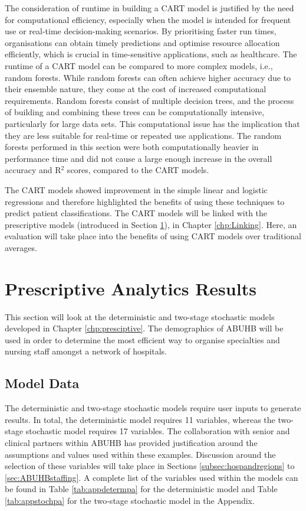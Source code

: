 \documentclass[../thesis.tex]{subfiles}
\begin{document}
The consideration of runtime in building a CART model is justified by the need for computational efficiency, especially when the model is intended for frequent use or real-time decision-making scenarios. By prioritising faster run times, organisations can obtain timely predictions and optimise resource allocation efficiently, which is crucial in time-sensitive applications, such as healthcare. The runtime of a CART model can be compared to more complex models, i.e., random forests. While random forests can often achieve higher accuracy due to their ensemble nature, they come at the cost of increased computational requirements. Random forests consist of multiple decision trees, and the process of building and combining these trees can be computationally intensive, particularly for large data sets. This computational issue has the implication that they are less suitable for real-time or repeated use applications. The random forests performed in this section were both computationally heavier in performance time and did not cause a large enough increase in the overall accuracy and R$^{2}$ scores, compared to the CART models.

The CART models showed improvement in the simple linear and logistic regressions and therefore highlighted the benefits of using these techniques to predict patient classifications. The CART models will be linked with the prescriptive models (introduced in Section \ref{sec:prescriptiveresults}), in Chapter \ref{chp:Linking}. Here, an evaluation will take place into the benefits of using CART models over traditional averages. 


\section{Prescriptive Analytics Results}\label{sec:prescriptiveresults}
This section will look at the deterministic and two-stage stochastic models developed in Chapter \ref{chp:presciptive}. The demographics of ABUHB will be used in order to determine the most efficient way to organise specialties and nursing staff amongst a network of hospitals.


\subsection{Model Data}
The deterministic and two-stage stochastic models require user inputs to generate results. In total, the deterministic model requires 11 variables, whereas the two-stage stochastic model requires 17 variables. The collaboration with senior and clinical partners within ABUHB has provided justification around the assumptions and values used within these examples. Discussion around the selection of these variables will take place in Sections \ref{subsec:hospandregions} to \ref{sec:ABUHBstaffing}. A complete list of the variables used within the models can be found in Table \ref{tab:appdetermpa} for the deterministic model and Table \ref{tab:appstochpa} for the two-stage stochastic model in the Appendix.
\end{document}
